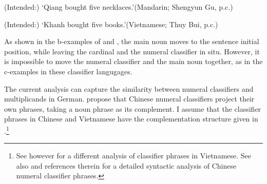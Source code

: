 \documentclass[output=paper]{langscibook}
\begin{document}

\z
\glt (Intended:) `Qiang bought five necklaces.'\hfill(Mandarin; Shengyun Gu, p.c.)
\ex\label{tat:viet.top}


\z
\glt (Intended:) `Khanh bought five books.'\hfill(Vietnamese; Thuy Bui, p.c.)
\z

\noindent As shown in the b-examples of  and , the main noun moves to the sentence initial position, while leaving the cardinal and the numeral classifier in situ. However, it is impossible to move the numeral classifier and the main noun together, as in the c-examples in these classifier langugages. 

The current analysis can capture the similarity between numeral classifiers and multiplicands in German. \citet{HuangOchi2014} propose that Chinese numeral classifiers project their own phrases, taking a noun phrase as its complement. I assume that the classifier phrases in Chinese and Vietnamese have the complementation structure given in .\footnote{See however \citet{Nguyen2004} for a different analysis of classifier phrases in Vietnamese. See also \citet{Zhang2013} and references therein for a detailed syntactic analysis of Chinese numeral classifier phrases.}
\end{document}
